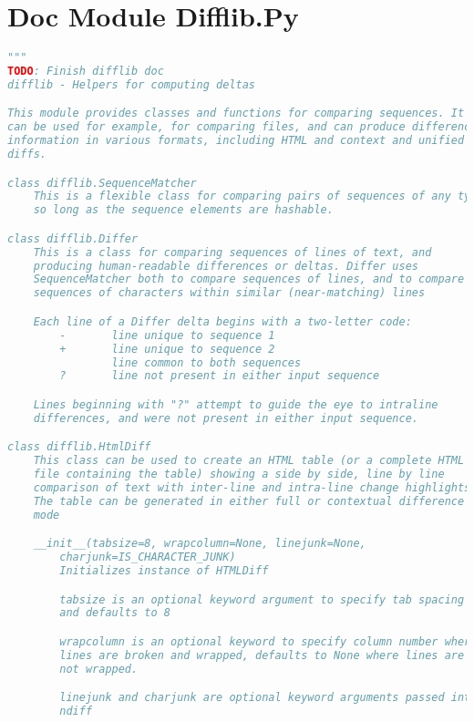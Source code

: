 \documentclass[a4paper,landscape]{report}
\begin{document}
\section{Doc Module Difflib.Py}
\begin{lstlisting}[language=Python]
"""
TODO: Finish difflib doc
difflib - Helpers for computing deltas

This module provides classes and functions for comparing sequences. It
can be used for example, for comparing files, and can produce difference
information in various formats, including HTML and context and unified
diffs.

class difflib.SequenceMatcher
    This is a flexible class for comparing pairs of sequences of any type
    so long as the sequence elements are hashable.

class difflib.Differ
    This is a class for comparing sequences of lines of text, and
    producing human-readable differences or deltas. Differ uses
    SequenceMatcher both to compare sequences of lines, and to compare
    sequences of characters within similar (near-matching) lines

    Each line of a Differ delta begins with a two-letter code:
        -       line unique to sequence 1
        +       line unique to sequence 2
                line common to both sequences
        ?       line not present in either input sequence

    Lines beginning with "?" attempt to guide the eye to intraline
    differences, and were not present in either input sequence.

class difflib.HtmlDiff
    This class can be used to create an HTML table (or a complete HTML
    file containing the table) showing a side by side, line by line
    comparison of text with inter-line and intra-line change highlights.
    The table can be generated in either full or contextual difference
    mode

    __init__(tabsize=8, wrapcolumn=None, linejunk=None,
        charjunk=IS_CHARACTER_JUNK)
        Initializes instance of HTMLDiff

        tabsize is an optional keyword argument to specify tab spacing
        and defaults to 8

        wrapcolumn is an optional keyword to specify column number where
        lines are broken and wrapped, defaults to None where lines are
        not wrapped.

        linejunk and charjunk are optional keyword arguments passed into
        ndiff


\end{lstlisting}
\end{document}
